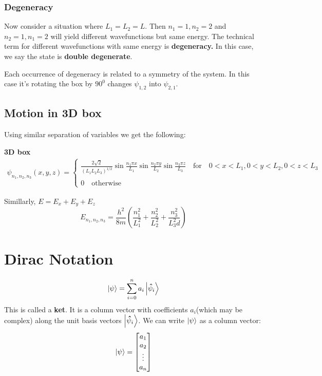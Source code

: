 \documentclass[11pt]{article}
\theoremstyle{definition}
\begin{document}
\subsubsection{Degeneracy}

Now consider a situation where $L_1 = L_2 = L$. Then $n_1 = 1, n_2 = 2$ and $n_2 = 1, n_1 = 2$ will yield different wavefunctions but same energy. The technical term for different wavefunctions with same energy is \textbf{degeneracy.} In this case, we say the state is \textbf{double degenerate}.

Each occurrence of degeneracy is related to a symmetry of the system. In this case it's rotating the box by $90^0$ changes $\psi_{1,2}$ into $\psi_{2,1}$.
\subsection{Motion in 3D box}

Using similar separation of variables we get the following:
\begin{shaded}
\textbf{3D box}
\begin{gather*}
    \psi_{n_1, n_2, n_3}(x,y,z) = \begin{cases}
    \frac{2\sqrt{2}}{(L_1 L_2 L_3)^{1/2}} \sin{\frac{n_1 \pi x}{L_1}} \sin{\frac{n_2 \pi y}{L_2}} \sin{\frac{n_3 \pi z}{L_3}} \quad \text{for} \quad 0<x<L_1, 0<y<L_2, 0<z<L_3\\
    \\
    0 \quad \text{otherwise}
    \end{cases}
\end{gather*}

Simillarly, $E = E_x + E_y + E_z$
\begin{equation*}
    E_{n_1, n_2,n_3} = \frac{h^2}{8m} \left(\frac{n_1^2}{L_1^2} + \frac{n_2^2}{L_2^2} + \frac{n_3^2}{L_3^2d}\right)
\end{equation*}
\end{shaded}


\section{Dirac Notation}

\begin{equation*}
    \ket{\psi} = \sum_{i=0}^n a_{i}\ket{\vectorunit{\psi}_i}
\end{equation*}
This is called a \textbf{ket}. It is a column vector with coefficients $a_i$(which may be complex) along the unit basis vectors $\ket{\vectorunit{\psi}_i}$. We can write $\ket{\psi}$ as a column vector:
\begin{equation}
   \ket{\psi}= \mqty[a_1 \\ a_2 \\ \vdots \\ a_n]
\end{equation}
\end{document}
